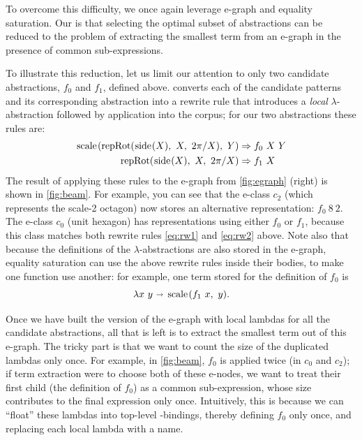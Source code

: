 %
To overcome this difficulty, we once again leverage e-graph and equality saturation.
%
Our  is that selecting the optimal subset of abstractions
can be reduced to the problem of extracting the smallest term from an e-graph
in the presence of common sub-expressions.

To illustrate this reduction,
let us limit our attention to only two candidate abstractions, $f_0$ and $f_1$, defined above.
%
\tool converts each of the candidate patterns and its corresponding abstraction into a rewrite rule
that introduces a \emph{local} $\lambda$-abstraction followed by application into the corpus;
for our two abstractions these rules are:
\begin{align}
  \scale{\repRot{\pSide{X}}{X}{2\pi/X}}{Y} &\Rightarrow f_0\ X\ Y\label{eq:rw1}\\ 
  \repRot{\pSide{X}}{X}{2\pi/X} &\Rightarrow f_1\ X \label{eq:rw2}
\end{align}
%
The result of applying these rules to the e-graph from \autoref{fig:egraph} (right)
is shown in \autoref{fig:beam}.
%
For example, you can see that the e-class $c_2$ (which represents the scale-2 octagon)
now stores an alternative representation:
$f_0\  8\ 2$.
%
The e-class $c_0$ (unit hexagon)
has representations using either $f_0$ or $f_1$,
because this class matches both rewrite rules \eqref{eq:rw1} and \eqref{eq:rw2} above. %
%
Note also that because the definitions of the $\lambda$-abstractions are also stored in the e-graph,
equality saturation can use the above rewrite rules inside their bodies,
to make one function use another:
for example, one term stored for the definition of $f_0$ is
$$
\lambda x\ y \bnd \scale{f_1\ x}{y}.
$$

Once we have built the version of the e-graph with local lambdas for all the candidate abstractions,
all that is left is to extract the smallest term out of this e-graph.
%
The tricky part is that we want to count the size of the duplicated lambdas only once.
%
For example, in \autoref{fig:beam}, $f_0$ is applied twice (in $c_0$ and $c_2$);
if term extraction were to choose both of these e-nodes,
we want to treat their first child (the definition of $f_0$) as a common sub-expression,
whose size contributes to the final expression only once.
%
Intuitively, this is because we can ``float'' these lambdas 
into top-level -bindings,
thereby defining $f_0$ only once, and replacing each local lambda with a name.

